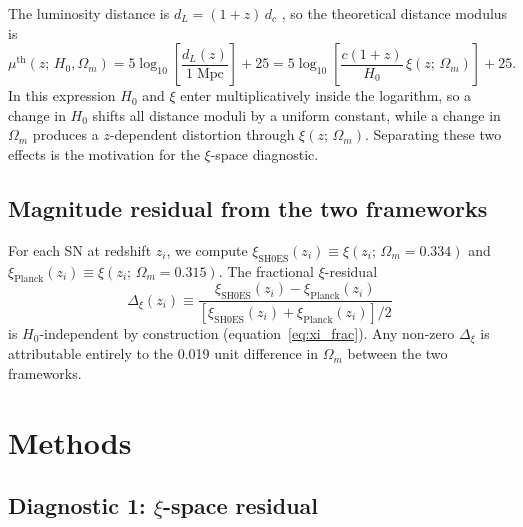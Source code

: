 \documentclass[fleqn,usenatbib,useAMS]{mnras}
\begin{document}
The luminosity distance is $d_L = (1+z)\,d_c$ \citep{hogg1999}, so the
theoretical distance modulus is \citep{hogg1999}
\begin{equation}
  \mu^\mathrm{th}(z;\,H_0,\Omega_m)
    = 5\log_{10}\!\left[\frac{d_L(z)}{1\;\mathrm{Mpc}}\right] + 25
    = 5\log_{10}\!\left[\frac{c(1+z)}{H_0}\,\xi(z;\,\Omega_m)\right] + 25.
  \label{eq:mu_th}
\end{equation}
In this expression $H_0$ and $\xi$ enter multiplicatively inside
the logarithm, so a change in $H_0$ shifts all distance moduli
by a uniform constant, while a change in $\Omega_m$ produces a
$z$-dependent distortion through $\xi(z;\,\Omega_m)$.
Separating these two effects is the motivation for the
$\xi$-space diagnostic.

\subsection{Magnitude residual from the two frameworks}

For each SN at redshift $z_i$, we compute
$\xi_\mathrm{SH0ES}(z_i) \equiv \xi(z_i;\,\Omega_m = 0.334)$
and $\xi_\mathrm{Planck}(z_i) \equiv \xi(z_i;\,\Omega_m = 0.315)$.
The fractional $\xi$-residual
\begin{equation}
  \Delta_\xi(z_i)
    \equiv \frac{\xi_\mathrm{SH0ES}(z_i) - \xi_\mathrm{Planck}(z_i)}
               {[\xi_\mathrm{SH0ES}(z_i) + \xi_\mathrm{Planck}(z_i)]/2}
  \label{eq:xi_frac}
\end{equation}
is $H_0$-independent by construction (equation~\ref{eq:xi_frac}).
Any non-zero $\Delta_\xi$ is attributable entirely to the 0.019
unit difference in $\Omega_m$ between the two frameworks.

\section{Methods}
\label{sec:methods}

\subsection{Diagnostic 1: $\xi$-space residual}
\label{sec:method_xi}
\end{document}

